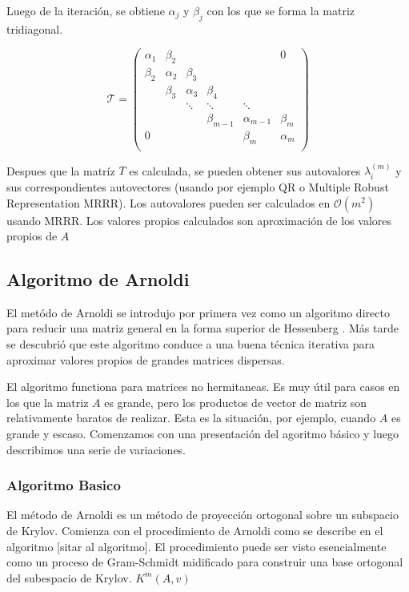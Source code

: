 \documentclass[a4paper,openright,12pt, oneside]{book}
\DeclareRobustCommand{\orderof}{\ensuremath{\mathcal{O}}}
\begin{document}
Luego de la iteraci\'on, se obtiene $\alpha_j$ y $\beta_j$ con los que se forma la matriz tridiagonal.

\begin{equation}
\mathcal{T} =
\left(
\begin{array}{cccccc}
\alpha_1 & \beta_2& & & & 0\\
\beta_2&   \alpha_2& \beta_3& & &  \\
&   \beta_3& \alpha_3& \beta_4& &  \\
&   & \ddots& \ddots& \ddots&  \\
&   & & \beta_{m-1}& \alpha_{m-1}& \beta_{m} \\
0&   & & & \beta_{m}& \alpha_{m} \\
\end{array}
\right)
\end{equation}

Despues que la matr\'iz $\displaystyle T$ es calculada, se pueden obtener sus autovalores $\lambda_i^{(m)}$ y sus correspondientes autovectores (usando por ejemplo QR o Multiple Robust Representation MRRR).
Los autovalores pueden ser calculados en $\orderof(m^2)$ usando MRRR.
Los valores propios calculados son aproximaci\'on de los valores propios de $\displaystyle A$

\subsection{Algoritmo de Arnoldi}

El met\'odo de Arnoldi se introdujo por primera vez como un algoritmo directo para reducir una matriz general en la forma superior de Hessenberg \cite{FORMHESS}. M\'as tarde se descubri\'o que este algoritmo conduce a una buena t\'ecnica iterativa para aproximar valores propios de grandes matrices dispersas.

El algoritmo functiona para matrices no hermitaneas. Es muy \'util para casos en los que la matriz $\displaystyle A$ es grande, pero los productos de vector de matriz son relativamente baratos de realizar. Esta es la situaci\'on, por ejemplo, cuando $\displaystyle A $ es grande y escaso. Comenzamos con una presentaci\'on del agoritmo b\'asico y luego describimos una serie de variaciones.

\subsubsection{Algoritmo Basico}
El m\'etodo de Arnoldi es un m\'etodo de proyecci\'on ortogonal sobre un subspacio de Krylov. Comienza con el procedimiento de Arnoldi como se describe en el algoritmo [sitar al algoritmo]. El procedimiento puede ser visto esencialmente como un proceso de Gram-Schmidt midificado para construir una base ortogonal del subespacio de Krylov. $\displaystyle K^{m}(A,v) $
\end{document}
